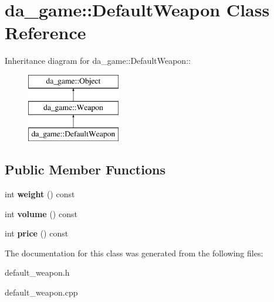 \hypertarget{classda__game_1_1DefaultWeapon}{
\section{da\_\-game::DefaultWeapon Class Reference}
\label{classda__game_1_1DefaultWeapon}
}
Inheritance diagram for da\_\-game::DefaultWeapon::\begin{figure}[H]
\begin{center}
\leavevmode
\includegraphics[height=3cm]{classda__game_1_1DefaultWeapon}
\end{center}
\end{figure}
\subsection*{Public Member Functions}
\begin{DoxyCompactItemize}
\item 
\hypertarget{classda__game_1_1DefaultWeapon_aa827b7dd05281ad20ff869666e493f5d}{
int {\bfseries weight} () const }
\label{classda__game_1_1DefaultWeapon_aa827b7dd05281ad20ff869666e493f5d}

\item 
\hypertarget{classda__game_1_1DefaultWeapon_a446988bb259fb96132fd7fb24da798f0}{
int {\bfseries volume} () const }
\label{classda__game_1_1DefaultWeapon_a446988bb259fb96132fd7fb24da798f0}

\item 
\hypertarget{classda__game_1_1DefaultWeapon_ac6c71d1c8cda696dc372a0e436dfcc98}{
int {\bfseries price} () const }
\label{classda__game_1_1DefaultWeapon_ac6c71d1c8cda696dc372a0e436dfcc98}

\end{DoxyCompactItemize}


The documentation for this class was generated from the following files:\begin{DoxyCompactItemize}
\item 
default\_\-weapon.h\item 
default\_\-weapon.cpp\end{DoxyCompactItemize}
